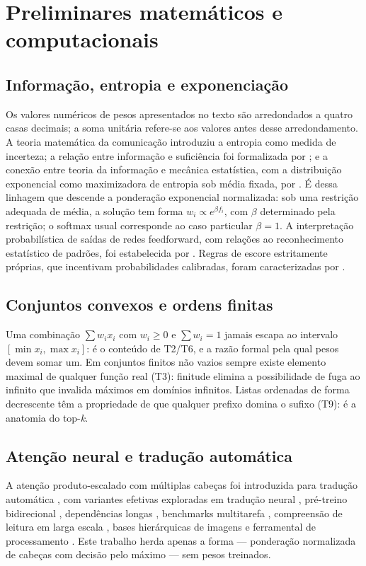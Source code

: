 \chapter{Preliminares matemáticos e computacionais}\label{cap:preliminares}
\section{Informação, entropia e exponenciação}
Os valores numéricos de pesos apresentados no texto são arredondados a quatro casas decimais; a soma unitária refere-se aos valores antes desse arredondamento.
A teoria matemática da comunicação \cite{shannon1948} introduziu a entropia como medida de incerteza; a relação entre informação e suficiência foi formalizada por \citet{kullback1951}; e a conexão entre teoria da informação e mecânica estatística, com a distribuição exponencial como maximizadora de entropia sob média fixada, por \citet{jaynes1957}. É dessa linhagem que descende a ponderação exponencial normalizada: sob uma restrição adequada de média, a solução tem forma $w_i\propto e^{\beta f_i}$, com $\beta$ determinado pela restrição; o softmax usual corresponde ao caso particular $\beta=1$. A interpretação probabilística de saídas de redes feedforward, com relações ao reconhecimento estatístico de padrões, foi estabelecida por \citet{bridle1990}. Regras de escore estritamente próprias, que incentivam probabilidades calibradas, foram caracterizadas por \citet{gneiting2007}.
\section{Conjuntos convexos e ordens finitas}
Uma combinação $\sum w_ix_i$ com $w_i\geq0$ e $\sum w_i=1$ jamais escapa ao intervalo $[\min x_i,\max x_i]$: é o conteúdo de T2/T6, e a razão formal pela qual pesos devem somar um. Em conjuntos finitos não vazios sempre existe elemento maximal de qualquer função real (T3): finitude elimina a possibilidade de fuga ao infinito que invalida máximos em domínios infinitos. Listas ordenadas de forma decrescente têm a propriedade de que qualquer prefixo domina o sufixo (T9): é a anatomia do top-\textit{k}.
\section{Atenção neural e tradução automática}
A atenção produto-escalado com múltiplas cabeças foi introduzida para tradução automática \cite{vaswani2017}, com variantes efetivas exploradas em tradução neural \cite{luong2015}, pré-treino bidirecional \cite{devlin2019}, dependências longas \cite{dai2019}, benchmarks multitarefa \cite{wang2018}, compreensão de leitura em larga escala \cite{rajpurkar2016}, bases hierárquicas de imagens \cite{deng2009} e ferramental de processamento \cite{wolf2020}. Este trabalho herda apenas a forma --- ponderação normalizada de cabeças com decisão pelo máximo --- sem pesos treinados.
